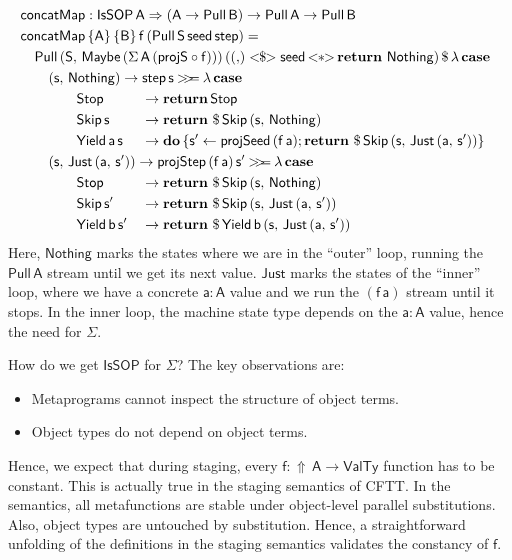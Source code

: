 \documentclass[acmsmall,screen,review,anonymous]{acmart}
\newcommand{\mit}[1]{{\mathsf{#1}}}
\newcommand{\msf}[1]{{\mathsf{#1}}}
\newcommand{\mbf}[1]{{\mathbf{#1}}}
\newcommand{\mdo}{\mbf{do}\,}
\newcommand{\ind}{\hspace{1em}}
\newcommand{\return}{\mbf{return}\,}
\newcommand{\lam}{\lambda\,}
\newcommand{\vA}{\mathsf{A}}
\newcommand{\vB}{\mathsf{B}}
\newcommand{\vS}{\mathsf{S}}
\newcommand{\va}{\mathsf{a}}
\newcommand{\vb}{\mathsf{b}}
\newcommand{\vf}{\mathsf{f}}
\newcommand{\vs}{\mathsf{s}}
\newcommand{\IsSOP}{\msf{IsSOP}}
\newcommand{\fro}{\leftarrow}
\newcommand{\case}{\mbf{case\,}}
\newcommand{\concatMap}{\msf{concatMap}}
\newcommand{\Lift}{{\Uparrow}}
\newcommand{\bind}{\mathbin{>\!\!>\mkern-6.7mu=}}
\newcommand{\VTy}{\msf{ValTy}}
\newcommand{\Maybe}{\msf{Maybe}}
\newcommand{\Nothing}{\msf{Nothing}}
\newcommand{\Just}{\msf{Just}}
\theoremstyle{remark}
\newcommand{\fmap}{<\!\!\$\!\!>}
\newcommand{\ap}{{<\!\!*\!\!>}}
\newcommand{\RA}{\Rightarrow}
\newcommand{\Stop}{\msf{Stop}}
\newcommand{\Skip}{\msf{Skip}}
\newcommand{\Yield}{\msf{Yield}}
\newcommand{\dlr}{\,\$\,}
\newcommand{\seed}{\mit{seed}}
\newcommand{\step}{\mit{step}}
\newcommand{\Pull}{\msf{Pull}}
\begin{document}
\begin{alignat*}{3}
  & \mathrlap{\concatMap : \IsSOP\,\vA \RA (\vA \to \Pull\,\vB) \to \Pull\,\vA \to \Pull\,\vB }\\
  & \mathrlap{\concatMap\,\{\vA\}\,\{\vB\}\,\vf\,(\Pull\,\vS\,\seed\,\step) = }\\
  & \mathrlap{\ind \Pull\,(\vS,\,\Maybe\,(\Sigma\,\vA\,(\mit{projS} \circ \vf)))\,(({,}) \fmap \seed\,\ap\,\return\,\Nothing) \dlr \lam \case }\\
  & \mathrlap{\ind \ind (\vs,\,\Nothing) \to \step\,\vs \bind \lam \case }\\
  & \ind \ind \ind \ind \Stop                 &&\to \return \Stop\\
  & \ind \ind \ind \ind \Skip\,\vs            &&\to \return \dlr \Skip\,(\vs,\, \Nothing)\\
  & \ind \ind \ind \ind \Yield\,\va\,\vs      &&\to \mdo \{\vs' \fro \mit{projSeed}\,(\vf\,\va); \return \dlr \Skip\,(\vs,\,\Just\,(\va,\,\vs'))\}\\
  & \mathrlap{\ind \ind (\vs,\,\Just\,(\va,\,\vs')) \to \mit{projStep}\,(\vf\,\va)\,\vs' \bind \lam \case }\\
  & \ind \ind \ind \ind \Stop                &&\to \return \dlr \Skip\,(\vs,\,\Nothing) \\
  & \ind \ind \ind \ind \Skip\,\vs'          &&\to \return \dlr \Skip\,(\vs,\,\Just\,(\va,\,\vs'))\\
  & \ind \ind \ind \ind \Yield\,\vb\,\vs'    &&\to \return \dlr \Yield\,\vb\,(\vs,\, \Just\,(\va,\,\vs'))
\end{alignat*}
Here, $\Nothing$ marks the states where we are in the ``outer'' loop, running
the $\Pull\,\vA$ stream until we get its next value. $\Just$ marks the states of
the ``inner'' loop, where we have a concrete $\va : \vA$ value and we run the
$(\vf\,\va)$ stream until it stops. In the inner loop, the machine state type
depends on the $\va : \vA$ value, hence the need for $\Sigma$.

How do we get $\IsSOP$ for $\Sigma$? The key observations are:
\begin{itemize}
 \item Metaprograms cannot inspect the structure of object terms.
 \item Object types do not depend on object terms.
\end{itemize}
Hence, we expect that during staging, every $\vf : \Lift\,\vA \to \VTy$ function
has to be constant. This is actually true in the staging semantics of CFTT. In
the semantics, all metafunctions are stable under object-level parallel
substitutions. Also, object types are untouched by substitution. Hence, a
straightforward unfolding of the definitions in the staging semantics validates
the constancy of $\vf$.
\end{document}
